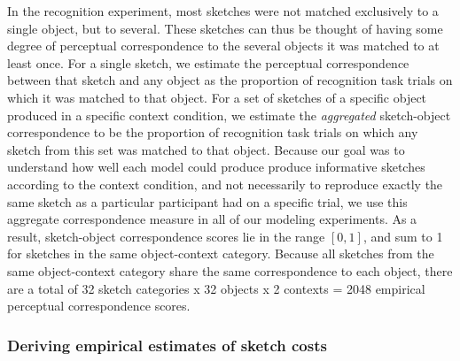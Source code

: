 \documentclass[9pt,twocolumn,twoside]{pnas-new}
\begin{document}
{%
In the recognition experiment, most sketches were not matched exclusively to a single object, but to several. 
These sketches can thus be thought of having some degree of perceptual correspondence to the several objects it was matched to at least once. 
For a single sketch, we estimate the perceptual correspondence between that sketch and any object as the proportion of recognition task trials on which it was matched to that object. 
For a set of sketches of a specific object produced in a specific context condition, we estimate the \textit{aggregated} sketch-object correspondence to be the proportion of recognition task trials on which any sketch from this set was matched to that object. 
Because our goal was to understand how well each model could produce produce informative sketches according to the context condition, and not necessarily to reproduce exactly the same sketch as a particular participant had on a specific trial, we use this aggregate correspondence measure in all of our modeling experiments.  
As a result, sketch-object correspondence scores lie in the range $[0,1]$, and sum to 1 for sketches in the same object-context category. 
Because all sketches from the same object-context category share the same correspondence to each object, there are a total of 32 sketch categories x 32 objects x 2 contexts = 2048 empirical perceptual correspondence scores.






\subsubsection*{Deriving empirical estimates of sketch costs}

}
\end{document}
